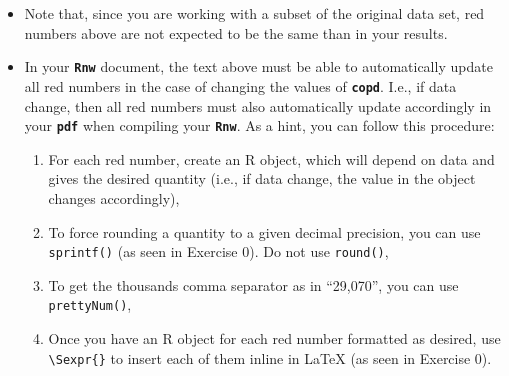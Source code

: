\documentclass[a4paper,10pt]{article}\usepackage[]{graphicx}\usepackage[]{xcolor}
\begin{document}
\begin{itemize}
    \item Note that, since you are working with a subset of the original data set, red numbers above are not expected to be the same than in your results.
    
    \item In your \textbf{\texttt{Rnw}} document, the text above must be able to automatically update all red numbers in the case of changing the values of \textbf{\texttt{copd}}. I.e., if data change, then all red numbers must also automatically update accordingly in your \textbf{\texttt{pdf}} when compiling your \textbf{\texttt{Rnw}}. As a hint, you can follow this procedure:
    
    \begin{enumerate}
        \item For each red number, create an \textsf{R} object, which will depend on data and gives the desired quantity (i.e., if data change, the value in the object changes accordingly),
        \item To force rounding a quantity to a given decimal precision, you can use \texttt{sprintf()} (as seen in Exercise 0). Do not use \texttt{round()},
        \item To get the thousands comma separator as in ``29,070'', you can use \texttt{prettyNum()},
        \item Once you have an \textsf{R} object for each red number formatted as desired, use \texttt{\textbackslash Sexpr\{\}} to insert each of them inline in \LaTeX{} (as seen in Exercise 0).
    \end{enumerate}
\end{itemize}
\end{document}
